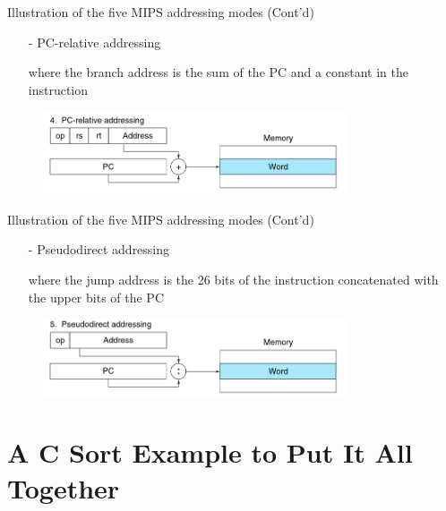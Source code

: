 \begin{frame}{Illustration of the five MIPS addressing modes (Cont'd)}
    
\begin{itemize}
\item[-] PC-relative addressing

where the branch address is the sum of the PC and a
constant in the instruction
\end{itemize}

\begin{figure}
\begin{center}
\includegraphics[width=0.8\textwidth, height=0.45\textheight]{docs/images/addr-4}
\end{center}
\end{figure}
\end{frame}
\begin{frame}{Illustration of the five MIPS addressing modes (Cont'd)}

\begin{itemize}
\item[-] Pseudodirect addressing

where the jump address is the 26 bits of the instruction concatenated with the upper bits of the PC
\end{itemize}

\begin{figure}
\begin{center}
\includegraphics[width=0.8\textwidth, height=0.4\textheight]{docs/images/addr-5}
\end{center}
\end{figure}
\end{frame}

\section{A C Sort Example to Put It All Together}